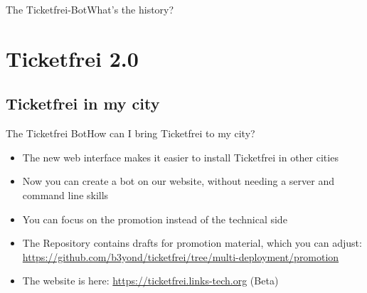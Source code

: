 \documentclass[10pt]{beamer}
\begin{document}
{\begin{frame}{The Ticketfrei-Bot}{What's the history?}
\end{frame}

\section{Ticketfrei 2.0}
\subsection{Ticketfrei in my city}
\begin{frame}{The Ticketfrei Bot}{How can I bring Ticketfrei to my city?}

\begin{itemize}
  \item<1-> The new web interface makes it easier to install Ticketfrei in other cities
  \item<1-> Now you can create a bot on our website, without needing a server and command line skills
  \item<1-> You can focus on the promotion instead of the technical side
  \item<1-> The Repository contains drafts for promotion material, which you can adjust: \url{https://github.com/b3yond/ticketfrei/tree/multi-deployment/promotion}
  \item<1-> The website is here: \url{https://ticketfrei.links-tech.org} (Beta)
\end{itemize}

\end{frame}

}
\end{document}
